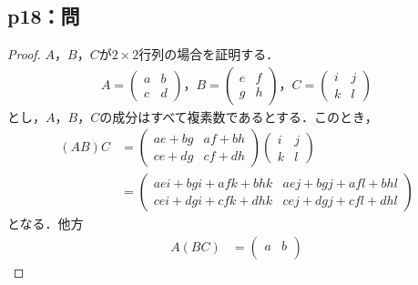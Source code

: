 \documentclass[uplatex,dvipdfmx,a4paper,11pt,fleqn]{jsarticle}
\begin{document}
\subsection*{p18：問}

\begin{tleftbar}
    \begin{proof}
        $A$，$B$，$C$が$2 \times 2$行列の場合を証明する．
        \begin{gather*}
            A=
            \begin{pmatrix}
                a & b \\
                c & d
            \end{pmatrix}
            ，
            B=
            \begin{pmatrix}
                e & f \\
                g & h
            \end{pmatrix}
            ，C=
            \begin{pmatrix}
                i & j \\
                k & l
            \end{pmatrix}
        \end{gather*}
        とし，$A$，$B$，$C$の成分はすべて複素数であるとする．このとき，
        \begin{align*}
            (AB)C & =
            \begin{pmatrix}
                ae+bg & af+bh \\
                ce+dg & cf+dh
            \end{pmatrix}
            \begin{pmatrix}
                i & j \\
                k & l
            \end{pmatrix}
            \\
            & =
            \begin{pmatrix}
                aei +bgi +afk +bhk & aej+bgj+afl+bhl \\
                cei +dgi+cfk +dhk & cej +dgj + cfl +dhl
            \end{pmatrix}
        \end{align*}
            となる．他方
            \begin{align*}
                A(BC)& =
                \begin{pmatrix}
                    a & b \\

\end{pmatrix}
\end{align*}
\end{proof}
\end{tleftbar}
\end{document}
